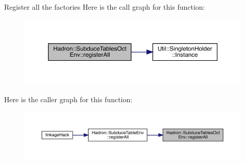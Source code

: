 Register all the factories Here is the call graph for this function\+:\nopagebreak
\begin{figure}[H]
\begin{center}
\leavevmode
\includegraphics[width=350pt]{d7/db0/namespaceHadron_1_1SubduceTablesOctEnv_a51ef987c89c5e4509cb7c7c24fb152d6_cgraph}
\end{center}
\end{figure}
Here is the caller graph for this function\+:
\nopagebreak
\begin{figure}[H]
\begin{center}
\leavevmode
\includegraphics[width=350pt]{d7/db0/namespaceHadron_1_1SubduceTablesOctEnv_a51ef987c89c5e4509cb7c7c24fb152d6_icgraph}
\end{center}
\end{figure}
